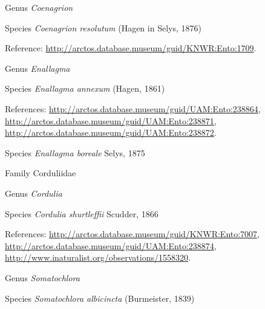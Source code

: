 \documentclass[9pt, article]{memoir}
\begin{document}
\begin{multicols}{2}
\vspace{6pt}\noindent\hspace{30pt}Genus \textit{Coenagrion}


\vspace{6pt}\noindent\hspace{36pt}Species \textit{Coenagrion resolutum} (Hagen in Selys, 1876)


\vspace{6pt}Reference: 
\url{http://arctos.database.museum/guid/KNWR:Ento:1709}.

\vspace{6pt}\noindent\hspace{30pt}Genus \textit{Enallagma}


\vspace{6pt}\noindent\hspace{36pt}Species \textit{Enallagma annexum} (Hagen, 1861)


\vspace{6pt}References: 
\url{http://arctos.database.museum/guid/UAM:Ento:238864}, 
\url{http://arctos.database.museum/guid/UAM:Ento:238871}, 
\url{http://arctos.database.museum/guid/UAM:Ento:238872}.

\vspace{6pt}\noindent\hspace{36pt}Species \textit{Enallagma boreale} Selys, 1875


\vspace{6pt}\noindent\hspace{24pt}Family Corduliidae


\vspace{6pt}\noindent\hspace{30pt}Genus \textit{Cordulia}


\vspace{6pt}\noindent\hspace{36pt}Species \textit{Cordulia shurtleffii} Scudder, 1866


\vspace{6pt}References: 
\url{http://arctos.database.museum/guid/KNWR:Ento:7007}, 
\url{http://arctos.database.museum/guid/UAM:Ento:238874}, 
\url{http://www.inaturalist.org/observations/1558320}.

\vspace{6pt}\noindent\hspace{30pt}Genus \textit{Somatochlora}


\vspace{6pt}\noindent\hspace{36pt}Species \textit{Somatochlora albicincta} (Burmeister, 1839)



\end{multicols}
\end{document}
